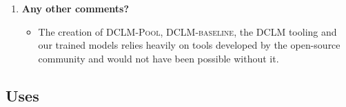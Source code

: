 \documentclass{article}
\newcommand{\dclm}{\textsc{DCLM}\xspace}
\newcommand{\rawpool}{\textsc{DCLM-Pool}\xspace}
\newcommand{\hqpool}{\textsc{DCLM-baseline}\xspace}
\begin{document}
\begin{enumerate}[label=Q\arabic*, resume]
\begin{itemize}
\begin{itemize}
\end{itemize}
For a more complete list of software and associated licenses, please refer to .
\end{itemize}

\item \textbf{Any other comments?}

\begin{itemize}
\item The creation of \rawpool, \hqpool, the \dclm tooling and our trained models relies heavily on tools developed by the open-source community and would not have been possible without it.
\end{itemize}

\end{enumerate}

\subsection{Uses}
\end{document}

